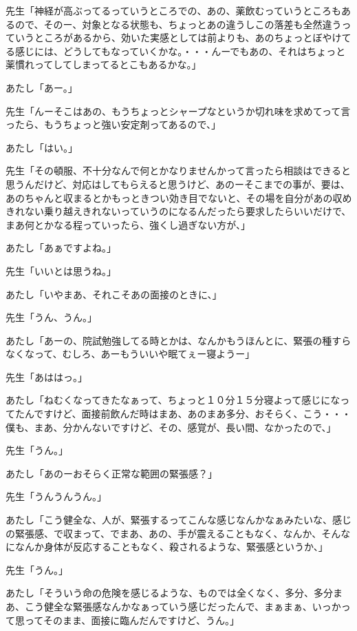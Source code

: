 \documentclass[b5j,twoside,twocolumn]{utarticle}
\begin{document}
\begin{description}
\item 先生「神経が高ぶってるっていうところでの、あの、薬飲むっていうところもあるので、そのー、対象となる状態も、ちょっとあの違うしこの落差も全然違うっていうところがあるから、効いた実感としては前よりも、あのちょっとぼやけてる感じには、どうしてもなっていくかな。・・・んーでもあの、それはちょっと薬慣れってしてしまってるとこもあるかな。」
\item あたし「あー。」
\item 先生「んーそこはあの、もうちょっとシャープなというか切れ味を求めてって言ったら、もうちょっと強い安定剤ってあるので、」
\item あたし「はい。」
\item 先生「その頓服、不十分なんで何とかなりませんかって言ったら相談はできると思うんだけど、対応はしてもらえると思うけど、あのーそこまでの事が、要は、あのちゃんと収まるとかもっときつい効き目でないと、その場を自分があの収めきれない乗り越えきれないっていうのになるんだったら要求したらいいだけで、まあ何とかなる程っていったら、強くし過ぎない方が、」
\item あたし「あぁですよね。」
\item 先生「いいとは思うね。」
\item あたし「いやまあ、それこそあの面接のときに、」
\item 先生「うん、うん。」
\item あたし「あーの、院試勉強してる時とかは、なんかもうほんとに、緊張の種すらなくなって、むしろ、あーもういいや眠てぇー寝ようー」
\item 先生「あははっ。」
\item あたし「ねむくなってきたなぁって、ちょっと１０分１５分寝よって感じになってたんですけど、面接前飲んだ時はまあ、あのまあ多分、おそらく、こう・・・僕も、まあ、分かんないですけど、その、感覚が、長い間、なかったので、」
\item 先生「うん。」
\item あたし「あのーおそらく正常な範囲の緊張感？」
\item 先生「うんうんうん。」
\item あたし「こう健全な、人が、緊張するってこんな感じなんかなぁみたいな、感じの緊張感、で収まって、でまあ、あの、手が震えることもなく、なんか、そんなになんか身体が反応することもなく、殺されるような、緊張感というか、」
\item 先生「うん。」
\item あたし「そういう命の危険を感じるような、ものでは全くなく、多分、多分まあ、こう健全な緊張感なんかなぁっていう感じだったんで、まぁまぁ、いっかって思ってそのまま、面接に臨んだんですけど、うん。」

\end{description}
\end{document}
